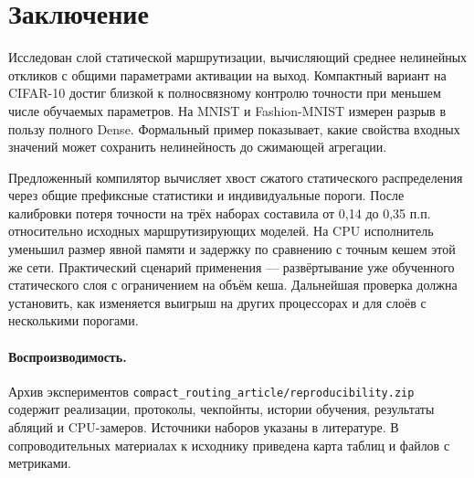 \documentclass[11pt,a4paper]{article}
\begin{document}
\section{Заключение}
Исследован слой статической маршрутизации, вычисляющий среднее нелинейных откликов с общими параметрами активации на выход. Компактный вариант на CIFAR-10 достиг близкой к полносвязному контролю точности при меньшем числе обучаемых параметров. На MNIST и Fashion-MNIST измерен разрыв в пользу полного Dense. Формальный пример показывает, какие свойства входных значений может сохранить нелинейность до сжимающей агрегации.

Предложенный компилятор вычисляет хвост сжатого статического распределения через общие префиксные статистики и индивидуальные пороги. После калибровки потеря точности на трёх наборах составила от 0,14 до 0,35 п.п. относительно исходных маршрутизирующих моделей. На CPU исполнитель уменьшил размер явной памяти и задержку по сравнению с точным кешем этой же сети. Практический сценарий применения — развёртывание уже обученного статического слоя с ограничением на объём кеша. Дальнейшая проверка должна установить, как изменяется выигрыш на других процессорах и для слоёв с несколькими порогами.

\paragraph{Воспроизводимость.}
Архив экспериментов \nolinkurl{compact_routing_article/reproducibility.zip} содержит реализации, протоколы, чекпойнты, истории обучения, результаты абляций и CPU-замеров. Источники наборов указаны в литературе. В сопроводительных материалах к исходнику приведена карта таблиц и файлов с метриками.

\printbibliography[title={Список литературы}]
\end{document}
